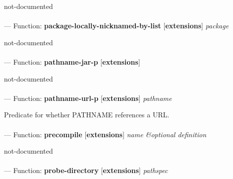 \begin{adjustwidth}{5em}{5em}
not-documented
\end{adjustwidth}

\paragraph{}
\label{EXTENSIONS:PACKAGE-LOCALLY-NICKNAMED-BY-LIST}
--- Function: \textbf{package-locally-nicknamed-by-list} [\textbf{extensions}] \textit{package}

\begin{adjustwidth}{5em}{5em}
not-documented
\end{adjustwidth}

\paragraph{}
\label{EXTENSIONS:PATHNAME-JAR-P}
--- Function: \textbf{pathname-jar-p} [\textbf{extensions}] \textit{}

\begin{adjustwidth}{5em}{5em}
not-documented
\end{adjustwidth}

\paragraph{}
\label{EXTENSIONS:PATHNAME-URL-P}
--- Function: \textbf{pathname-url-p} [\textbf{extensions}] \textit{pathname}

\begin{adjustwidth}{5em}{5em}
Predicate for whether PATHNAME references a URL.
\end{adjustwidth}

\paragraph{}
\label{EXTENSIONS:PRECOMPILE}
--- Function: \textbf{precompile} [\textbf{extensions}] \textit{name \&optional definition}

\begin{adjustwidth}{5em}{5em}
not-documented
\end{adjustwidth}

\paragraph{}
\label{EXTENSIONS:PROBE-DIRECTORY}
--- Function: \textbf{probe-directory} [\textbf{extensions}] \textit{pathspec}

